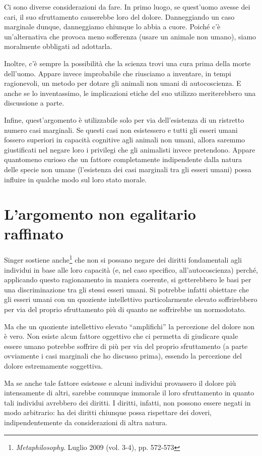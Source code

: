 \documentclass[a4paper,11pt,oneside,article]{memoir}
\begin{document}
Ci sono diverse considerazioni da fare. In primo luogo, se quest'uomo avesse dei
cari, il suo sfruttamento causerebbe loro del dolore. Danneggiando un caso
marginale dunque, danneggiamo chiunque lo abbia a cuore. Poiché c'è
un'alternativa che provoca meno sofferenza (usare un animale non umano), siamo
moralmente obbligati ad adottarla.

Inoltre, c'è sempre la possibilità che la scienza trovi una cura prima della
morte dell'uomo. Appare invece improbabile che riusciamo a inventare, in tempi
ragionevoli, un metodo per dotare gli animali non umani di autocoscienza. E
anche se lo inventassimo, le implicazioni etiche del suo utilizzo meriterebbero
una discussione a parte.

Infine, quest'argomento è utilizzabile solo per via dell'esistenza di un
ristretto numero casi marginali. Se questi casi non esistessero e tutti gli
esseri umani fossero superiori in capacità cognitive agli animali non umani,
allora saremmo giustificati nel negare loro i privilegi che gli animalisti
invece pretendono. Appare quantomeno curioso che un fattore completamente
indipendente dalla natura delle specie non umane (l'esistenza dei casi marginali
tra gli esseri umani) possa influire in qualche modo sul loro stato morale.

\section{L'argomento non egalitario raffinato}

Singer sostiene anche\footnote{\emph{Metaphilosophy}. Luglio 2009 (vol. 3-4),
pp. 572-573} che non si possano negare dei diritti fondamentali agli individui
in base alle loro capacità (e, nel caso specifico, all'autocoscienza) perché,
applicando questo ragionamento in maniera coerente, si getterebbero le basi per
una discriminazione tra gli stessi esseri umani. Si potrebbe infatti obiettare
che gli esseri umani con un quoziente intellettivo particolarmente elevato
soffrirebbero per via del proprio sfruttamento più di quanto ne soffrirebbe un
normodotato.

Ma che un quoziente intellettivo elevato ``amplifichi'' la percezione del dolore
non è vero. Non esiste alcun fattore oggettivo che ci permetta di giudicare
quale essere umano potrebbe soffrire di più per via del proprio sfruttamento (a
parte ovviamente i casi marginali che ho discusso prima), essendo la percezione
del dolore estremamente soggettiva.

Ma se anche tale fattore esistesse e alcuni individui provassero il dolore più
intensamente di altri, sarebbe comunque immorale il loro sfruttamento in quanto
tali individui avrebbero dei diritti. I diritti, infatti, non possono essere
negati in modo arbitrario: ha dei diritti chiunque possa rispettare dei doveri,
indipendentemente da considerazioni di altra natura.
\end{document}
